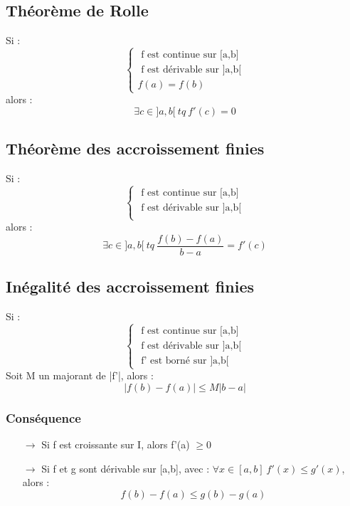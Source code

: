 \subsection{Théorème de Rolle}
\begin{theo}
 Si :
$$\left\{\begin{array}{l}
     \mbox{ f est continue sur [a,b]}\\
     \mbox{ f est dérivable sur ]a,b[}\\
     f(a) = f(b)
  \end{array}\right.$$
alors : 
$$\exists c \in ]a,b[~ tq~ f'(c)=0$$
\end{theo}
\subsection{Théorème des accroissement finies}
\begin{theo}
Si :
$$\left\{\begin{array}{l}
     \mbox{ f est continue sur [a,b]}\\
     \mbox{ f est dérivable sur ]a,b[}\\
  \end{array}\right.$$
alors :
$$\exists c \in ]a,b[~ tq~ \dfrac{f(b)-f(a)}{b-a} = f'(c)$$
\end{theo}
\subsection{Inégalité des accroissement finies}
\begin{theo}
Si :
$$\left\{\begin{array}{l}
     \mbox{ f est continue sur [a,b]}\\
     \mbox{ f est dérivable sur ]a,b[}\\
     \mbox{ f' est borné sur ]a,b[}
  \end{array}\right.$$
Soit M un majorant de |f'|, alors :
$$|f(b) - f(a)| \leq M|b-a|$$
\end{theo}
\subsubsection{Conséquence}
\begin{itemize}
 \item[$\rightarrow$] Si f est croissante sur I, alors f'(a) $\geq 0$
 \item[$\rightarrow$] Si f et g sont dérivable sur [a,b], avec : $\forall x \in [a,b]~ f'(x) \leq g'(x)$, alors :
$$f(b)-f(a) \leq g(b)-g(a)$$
\end{itemize}
